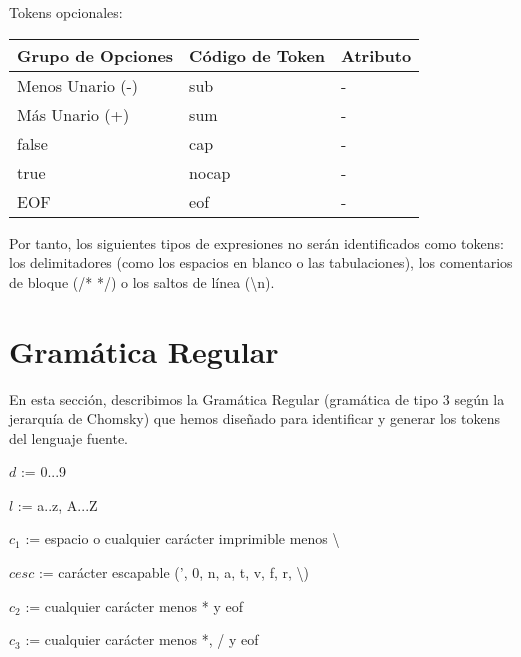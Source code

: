 \documentclass{article}
\begin{document}
Tokens opcionales:
\begin{table}[h!]
    \centering
    \begin{tabular}{|l|l|l|}
        \hline
		\rowcolor{gray!20} %
        \textbf{Grupo de Opciones} & \textbf{Código de Token} & \textbf{Atributo} \\ \hline
        Menos Unario (-) & sub & - \\ \hline
        Más Unario (+) & sum & - \\ \hline
        false & cap & - \\ \hline
        true & nocap & - \\ \hline
        EOF & eof & - \\ \hline
    \end{tabular}
\end{table}

Por tanto, los siguientes tipos de expresiones no serán identificados como tokens: los delimitadores (como los espacios en blanco o las tabulaciones), los comentarios de bloque (/* */) o los saltos de línea (\textbackslash n).

\section{Gramática Regular}

En esta sección, describimos la Gramática Regular (gramática de tipo 3 según la jerarquía de Chomsky) que hemos diseñado para identificar y generar los tokens del lenguaje fuente. 

\vspace{0.1cm}

\begin{center}
    \begin{tcolorbox}[title=Símbolos no terminales, width=0.57\textwidth]
        $d$ := 0...9
        
        $l$ := a..z, A...Z
        
        $c_1$ := espacio o cualquier carácter imprimible menos \textbackslash
        
        $cesc$ := carácter escapable (', 0, n, a, t, v, f, r, \textbackslash )
        
        $c_2$ := cualquier carácter menos * y eof
        
        $c_3$ := cualquier carácter menos *, / y eof
    \end{tcolorbox}
\end{center}
\end{document}
